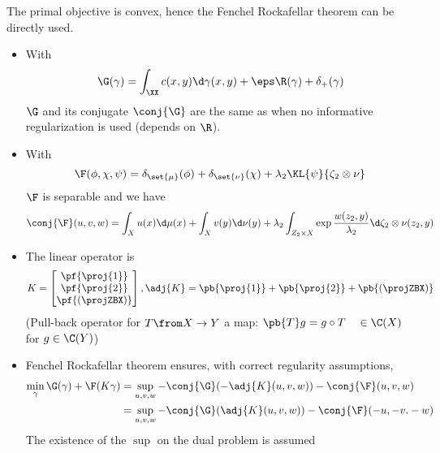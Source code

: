 \documentclass[11pt,a4paper]{article}
\begin{document}
The primal objective is convex, hence the Fenchel Rockafellar theorem can be directly used.
\begin{itemize}
    \item With \begin{equation}\G(\gamma) = \int_{\XX} c(x,y) \d \gamma(x,y) + \eps
        \R(\gamma) + \delta_{+}(\gamma)\end{equation}
        $\G$ and its conjugate
        $\conj{\G}$ are the same as when no informative regularization is used (depends on $\R$).

    \item
        With
        \begin{equation}
            \F(\phi, \chi, \psi) = \delta_{\set{\mu}}(\phi) + \delta_{\set{\nu}}(\chi) + \lambda_2 \KL{\psi}{\zeta_2 \otimes \nu}
        \end{equation}
        $\F$ is separable and we have
        \begin{equation}
            \conj{\F}(u, v, w) = \int_{X}u(x) \d \mu(x) + \int_{X} v(y) \d \nu(y) + \lambda_2 \int_{Z_2 \times X} \exp{\frac{w(z_2,y)}{\lambda_2}}\d \zeta_2 \otimes \nu (z_2, y)
        \end{equation}

    \item The linear operator is
        \begin{equation}
            K = \begin{bmatrix}
                \pf{\proj{1}} \\
                \pf{\proj{2}} \\
                \pf{(\projZBX)}
            \end{bmatrix},
            \adj{K} = \pb{\proj{1}} + \pb{\proj{2}} + \pb{(\projZBX)}
        \end{equation}
        (Pull-back operator for $T\from X \to Y$ a map: $\pb{T}g = g \circ T \quad \in \C(X)$ for $g \in \C(Y)$)

    \item
        Fenchel Rockafellar theorem ensures, with correct regularity assumptions,
        \begin{align}
            \min_{\gamma} \G(\gamma) + \F(K\gamma) &= \sup_{u, v, w} - \conj{\G}(-\adj{K}(u, v, w)) - \conj{\F}(u, v, w)\\
                                                   &= \sup_{u, v, w} - \conj{\G}(\adj{K}(u, v, w)) - \conj{\F}(-u, -v. -w)\\
        \end{align}
        The existence of the $\sup$ on the dual problem is assumed
\end{itemize}
\end{document}
